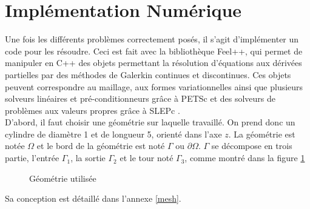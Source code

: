 \part{Implémentation Numérique}
\label{partImp}

Une fois les différents problèmes correctement posés, il s'agit d'implémenter un code pour les résoudre. Ceci est fait avec la bibliothèque Feel++, qui permet de manipuler en C++ des objets permettant la résolution d'équations aux dérivées partielles par des méthodes de Galerkin continues et discontinues. Ces objets peuvent correspondre au maillage, aux formes variationnelles ainsi que plusieurs solveurs linéaires et pré-conditionneurs grâce à PETSc \cite{petsc-web-page,petsc-user-ref,petsc-efficient} et des solveurs de problèmes aux valeurs propres grâce à SLEPc \cite{Hernandez:2005:SSF}.\\

D'abord, il faut choisir une géométrie sur laquelle travaillé. On prend donc un cylindre de diamètre 1 et de longueur 5, orienté dans l'axe $z$. La géométrie est notée $\Omega$ et le bord de la géométrie est noté $\Gamma$ ou $\partial\Omega$. $\Gamma$ se décompose en trois partie, l'entrée $\Gamma_1$,  la sortie $\Gamma_2$ et le tour noté $\Gamma_3$, comme montré dans la figure \ref{figMesh}\\

\begin{figure}[H]
\centering
{}
\caption{Géométrie utilisée}
\label{figMesh}
\end{figure}

Sa conception est détaillé dans l'annexe \ref{mesh}.

